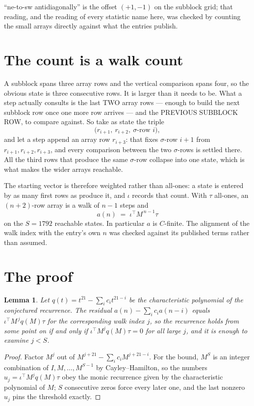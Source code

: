 \documentclass[11pt,a4paper]{article}
\theoremstyle{plain}
\newtheorem{lemma}[theorem]{Lemma}
\theoremstyle{definition}
\begin{document}
``ne-to-sw antidiagonally'' is the offset $(+1,-1)$ on the subblock grid; that reading, and
the reading of every statistic name here, was checked by counting the small arrays directly
against what the entries publish.

\section{The count is a walk count}

A subblock spans three array rows and the vertical comparison spans four, so the obvious state
is three consecutive rows. It is larger than it needs to be. What a step actually consults is
the last TWO array rows --- enough to build the next subblock row once one more row arrives ---
and the PREVIOUS SUBBLOCK ROW, to compare against. So take as state the triple
\[
\bigl(r_{i+1},\ r_{i+2},\ \sigma\text{-row }i\bigr),
\]
and let a step append an array row $r_{i+3}$: that fixes $\sigma$-row $i+1$ from
$r_{i+1},r_{i+2},r_{i+3}$, and every comparison between the two $\sigma$-rows is settled
there. All the third rows that produce the same $\sigma$-row collapse into one state, which is
what makes the wider arrays reachable.

The starting vector is therefore weighted rather than all-ones: a state is entered by as many
first rows as produce it, and $\iota$ records that count. With $\tau$ all-ones, an
$(n+2)$-row array is a walk of $n-1$ steps and
\[
a(n)\;=\;\iota^{\!\top}M^{\,n-1}\tau
\]
on the $S=1792$ reachable states. In particular $a$ is $C$-finite. The alignment of the walk
index with the entry's own $n$ was checked against its published terms rather than assumed.

\section{The proof}

\begin{lemma}\label{lem:crit}
Let $q(t)=t^{21}-\sum_i c_it^{21-i}$ be the characteristic polynomial of the
conjectured recurrence. The residual $a(n)-\sum_ic_ia(n-i)$ equals
$\iota^{\!\top}M^{\,j}q(M)\tau$ for the corresponding walk index $j$, so the recurrence
holds from some point on if and only if $\iota^{\!\top}M^{j}q(M)\tau=0$ for all large $j$,
and it is enough to examine $j<S$.
\end{lemma}

\begin{proof}
Factor $M^{j}$ out of $M^{j+21}-\sum_ic_iM^{j+21-i}$. For the bound, $M^{S}$
is an integer combination of $I,M,\dots,M^{S-1}$ by Cayley--Hamilton, so the numbers
$u_j=\iota^{\!\top}M^{j}q(M)\tau$ obey the monic recurrence given by the characteristic
polynomial of $M$; $S$ consecutive zeros force every later one, and the last nonzero $u_j$
pins the threshold exactly.
\end{proof}
\end{document}
